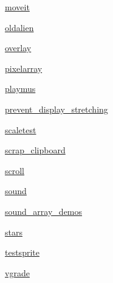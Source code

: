 \begin{DoxyCompactItemize}
\item 
 \hyperlink{namespacepygame_1_1examples_1_1moveit}{moveit}
\item 
 \hyperlink{namespacepygame_1_1examples_1_1oldalien}{oldalien}
\item 
 \hyperlink{namespacepygame_1_1examples_1_1overlay}{overlay}
\item 
 \hyperlink{namespacepygame_1_1examples_1_1pixelarray}{pixelarray}
\item 
 \hyperlink{namespacepygame_1_1examples_1_1playmus}{playmus}
\item 
 \hyperlink{namespacepygame_1_1examples_1_1prevent__display__stretching}{prevent\+\_\+display\+\_\+stretching}
\item 
 \hyperlink{namespacepygame_1_1examples_1_1scaletest}{scaletest}
\item 
 \hyperlink{namespacepygame_1_1examples_1_1scrap__clipboard}{scrap\+\_\+clipboard}
\item 
 \hyperlink{namespacepygame_1_1examples_1_1scroll}{scroll}
\item 
 \hyperlink{namespacepygame_1_1examples_1_1sound}{sound}
\item 
 \hyperlink{namespacepygame_1_1examples_1_1sound__array__demos}{sound\+\_\+array\+\_\+demos}
\item 
 \hyperlink{namespacepygame_1_1examples_1_1stars}{stars}
\item 
 \hyperlink{namespacepygame_1_1examples_1_1testsprite}{testsprite}
\item 
 \hyperlink{namespacepygame_1_1examples_1_1vgrade}{vgrade}
\end{DoxyCompactItemize}

